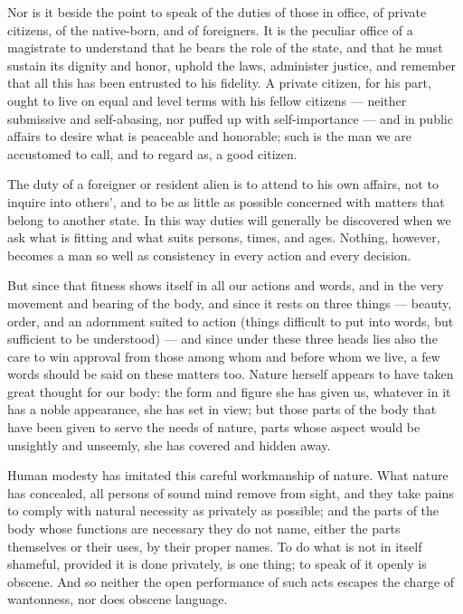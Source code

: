  Nor is it beside the point to speak of the duties of those in office, of private citizens, of the native-born, and of foreigners. It is the peculiar office of a magistrate to understand that he bears the role of the state, and that he must sustain its dignity and honor, uphold the laws, administer justice, and remember that all this has been entrusted to his fidelity. A private citizen, for his part, ought to live on equal and level terms with his fellow citizens — neither submissive and self-abasing, nor puffed up with self-importance — and in public affairs to desire what is peaceable and honorable; such is the man we are accustomed to call, and to regard as, a good citizen.

 The duty of a foreigner or resident alien is to attend to his own affairs, not to inquire into others', and to be as little as possible concerned with matters that belong to another state. In this way duties will generally be discovered when we ask what is fitting and what suits persons, times, and ages. Nothing, however, becomes a man so well as consistency in every action and every decision.

 But since that fitness shows itself in all our actions and words, and in the very movement and bearing of the body, and since it rests on three things — beauty, order, and an adornment suited to action (things difficult to put into words, but sufficient to be understood) — and since under these three heads lies also the care to win approval from those among whom and before whom we live, a few words should be said on these matters too. Nature herself appears to have taken great thought for our body: the form and figure she has given us, whatever in it has a noble appearance, she has set in view; but those parts of the body that have been given to serve the needs of nature, parts whose aspect would be unsightly and unseemly, she has covered and hidden away.

 Human modesty has imitated this careful workmanship of nature. What nature has concealed, all persons of sound mind remove from sight, and they take pains to comply with natural necessity as privately as possible; and the parts of the body whose functions are necessary they do not name, either the parts themselves or their uses, by their proper names. To do what is not in itself shameful, provided it is done privately, is one thing; to speak of it openly is obscene. And so neither the open performance of such acts escapes the charge of wantonness, nor does obscene language.

